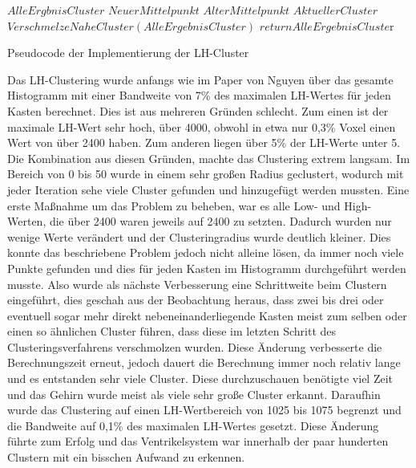 \IncMargin{1em}
\begin{algorithm}

 \BlankLine
 $AlleErgbnisCluster$\;
 $NeuerMittelpunkt$\;
 $AlterMittelpunkt$\;
 $AktuellerCluster$\;
$VerschmelzeNaheCluster(AlleErgebnisCluster)$\;
$return AlleErgebnisCluste$r\;

 \caption{Pseudocode der Implementierung der LH-Cluster}
 \label{alg:clustering}
\end{algorithm}\DecMargin{1em}






Das LH-Clustering wurde anfangs wie im Paper von Nguyen \cite{nguyen2012clustering} über das gesamte Histogramm mit einer Bandweite von 7\% des maximalen LH-Wertes für jeden Kasten berechnet. Dies ist aus mehreren Gründen schlecht. Zum einen ist der maximale LH-Wert sehr hoch, über 4000, obwohl in etwa nur 0,3\% Voxel einen Wert von über 2400 haben. Zum anderen liegen über 5\% der LH-Werte unter 5. Die Kombination aus diesen Gründen, machte das Clustering extrem langsam. Im Bereich von 0 bis 50  wurde in einem sehr großen Radius geclustert, wodurch mit jeder Iteration sehe viele Cluster gefunden und hinzugefügt werden mussten. Eine erste Maßnahme um das Problem zu beheben, war es alle Low- und High- Werten, die über 2400 waren jeweils auf 2400 zu setzten. Dadurch wurden nur wenige Werte verändert und der Clusteringradius wurde deutlich kleiner. Dies konnte das beschriebene Problem jedoch nicht alleine lösen, da immer noch viele Punkte gefunden und dies für jeden Kasten im Histogramm durchgeführt werden musste. Also wurde als nächste Verbesserung eine Schrittweite beim Clustern eingeführt, dies geschah aus der Beobachtung heraus, dass zwei bis drei oder eventuell sogar mehr direkt nebeneinanderliegende Kasten meist zum selben oder einen so ähnlichen Cluster führen, dass diese im letzten Schritt des Clusteringsverfahrens verschmolzen wurden. Diese Änderung verbesserte die Berechnungszeit erneut, jedoch  dauert die Berechnung immer noch relativ lange und es entstanden sehr viele Cluster. Diese durchzuschauen benötigte viel Zeit und das Gehirn wurde meist als viele sehr große Cluster erkannt. Daraufhin wurde das Clustering auf einen LH-Wertbereich von 1025 bis 1075 begrenzt und die Bandweite auf 0,1\% des maximalen LH-Wertes gesetzt. Diese Änderung führte zum Erfolg und das Ventrikelsystem war innerhalb der paar hunderten Clustern mit ein bisschen Aufwand zu erkennen.


